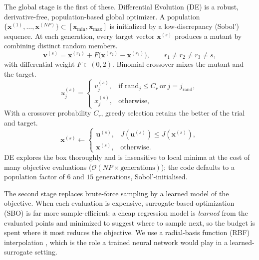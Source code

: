 \documentclass{article}
\newcommand{\xv}{\bm{x}}
\begin{document}
The global stage is the first of these. Differential Evolution (DE)
\citep{Storn1997} is a robust, derivative-free,
population-based global optimizer. A population
$\{\xv^{(1)},\dots,\xv^{(NP)}\}\subset[\xv_{\min},\xv_{\max}]$ is initialized by a
low-discrepancy (Sobol') sequence. At each generation, every target vector
$\xv^{(s)}$ produces a mutant by combining distinct random members.
\begin{equation}
  \bm{v}^{(s)}=\xv^{(r_1)}+F\big(\xv^{(r_2)}-\xv^{(r_3)}\big),
  \qquad r_1\ne r_2\ne r_3\ne s,
  \label{eq:de-mut}
\end{equation}
with differential weight $F\in(0,2)$. Binomial crossover mixes the mutant and the target.
\begin{equation}
  u^{(s)}_j=
  \begin{cases}
    v^{(s)}_j, & \text{if } \mathrm{rand}_j\le C_r \ \text{or}\ j=j_{\mathrm{rand}},\\
    x^{(s)}_j, & \text{otherwise,}
  \end{cases}
  \label{eq:de-cross}
\end{equation}
With a crossover probability $C_r$, greedy selection retains the better of the trial
and target.
\begin{equation}
  \xv^{(s)}\leftarrow
  \begin{cases}
    \bm{u}^{(s)}, & J(\bm{u}^{(s)})\le J(\xv^{(s)}),\\
    \xv^{(s)},    & \text{otherwise.}
  \end{cases}
  \label{eq:de-sel}
\end{equation}
DE explores the box thoroughly and is insensitive to local minima at the cost of
many objective evaluations ($\mathcal{O}(NP\times\text{generations})$); the code
defaults to a population factor of $6$ and $15$ generations, Sobol'-initialised.

The second stage replaces brute-force sampling by a learned model of the
objective. When each evaluation is expensive, surrogate-based optimization (SBO)
\citep{Jones1998,Forrester2009} is far more sample-efficient: a cheap regression
model is \emph{learned} from the evaluated points and minimized to suggest where
to sample next, so the budget is spent where it most reduces the objective. We use
a radial-basis function (RBF) interpolation \citep{Hardy1971,Wendland2004,Gutmann2001},
which is the role a trained neural network would play in a learned-surrogate setting.
\end{document}
